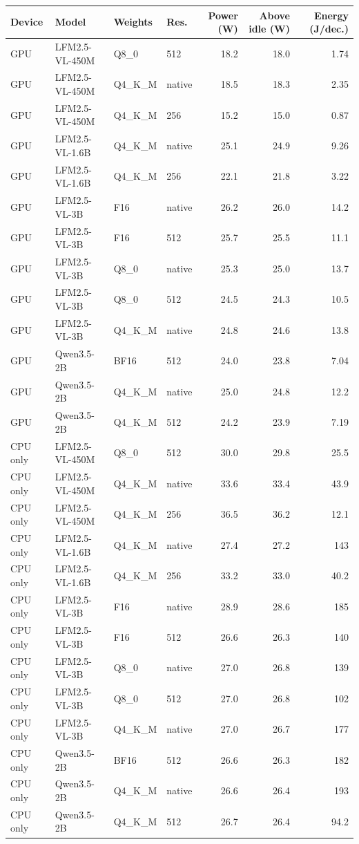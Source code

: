 \begin{tabular}{llllrrr}
\toprule
Device & Model & Weights & Res. & Power (W) & Above idle (W) & Energy (J/dec.) \\
\midrule
GPU & LFM2.5-VL-450M & Q8\_0 & 512 & 18.2 & 18.0 & 1.74 \\
GPU & LFM2.5-VL-450M & Q4\_K\_M & native & 18.5 & 18.3 & 2.35 \\
GPU & LFM2.5-VL-450M & Q4\_K\_M & 256 & 15.2 & 15.0 & 0.87 \\
GPU & LFM2.5-VL-1.6B & Q4\_K\_M & native & 25.1 & 24.9 & 9.26 \\
GPU & LFM2.5-VL-1.6B & Q4\_K\_M & 256 & 22.1 & 21.8 & 3.22 \\
GPU & LFM2.5-VL-3B & F16 & native & 26.2 & 26.0 & 14.2 \\
GPU & LFM2.5-VL-3B & F16 & 512 & 25.7 & 25.5 & 11.1 \\
GPU & LFM2.5-VL-3B & Q8\_0 & native & 25.3 & 25.0 & 13.7 \\
GPU & LFM2.5-VL-3B & Q8\_0 & 512 & 24.5 & 24.3 & 10.5 \\
GPU & LFM2.5-VL-3B & Q4\_K\_M & native & 24.8 & 24.6 & 13.8 \\
GPU & Qwen3.5-2B & BF16 & 512 & 24.0 & 23.8 & 7.04 \\
GPU & Qwen3.5-2B & Q4\_K\_M & native & 25.0 & 24.8 & 12.2 \\
GPU & Qwen3.5-2B & Q4\_K\_M & 512 & 24.2 & 23.9 & 7.19 \\
\midrule
CPU only & LFM2.5-VL-450M & Q8\_0 & 512 & 30.0 & 29.8 & 25.5 \\
CPU only & LFM2.5-VL-450M & Q4\_K\_M & native & 33.6 & 33.4 & 43.9 \\
CPU only & LFM2.5-VL-450M & Q4\_K\_M & 256 & 36.5 & 36.2 & 12.1 \\
CPU only & LFM2.5-VL-1.6B & Q4\_K\_M & native & 27.4 & 27.2 & 143 \\
CPU only & LFM2.5-VL-1.6B & Q4\_K\_M & 256 & 33.2 & 33.0 & 40.2 \\
CPU only & LFM2.5-VL-3B & F16 & native & 28.9 & 28.6 & 185 \\
CPU only & LFM2.5-VL-3B & F16 & 512 & 26.6 & 26.3 & 140 \\
CPU only & LFM2.5-VL-3B & Q8\_0 & native & 27.0 & 26.8 & 139 \\
CPU only & LFM2.5-VL-3B & Q8\_0 & 512 & 27.0 & 26.8 & 102 \\
CPU only & LFM2.5-VL-3B & Q4\_K\_M & native & 27.0 & 26.7 & 177 \\
CPU only & Qwen3.5-2B & BF16 & 512 & 26.6 & 26.3 & 182 \\
CPU only & Qwen3.5-2B & Q4\_K\_M & native & 26.6 & 26.4 & 193 \\
CPU only & Qwen3.5-2B & Q4\_K\_M & 512 & 26.7 & 26.4 & 94.2 \\
\bottomrule
\end{tabular}
